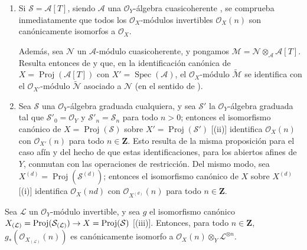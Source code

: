 \documentclass[oneside,10pt]{amsart}
\makeatletter
\newcommand{\ega@arrow}[2]{\mathchoice{#1}{#2}{#2}{#2}}
\renewcommand{\to}{\ega@arrow{\longrightarrow}{\rightarrow}}
\let\EGAOriginalLabel\label
\renewcommand{\label}[1]{\phantomsection\EGAOriginalLabel{#1}}
\makeatother
\begin{document}
\begin{remarks}[3.2.9]
\label{II.3.2.9-fr}
\medskip\noindent
\begin{enumerate}
  \item Si $\mathcal{S}=\mathcal{A}[T]$, siendo $\mathcal{A}$ una $\mathcal{O}_Y$-álgebra cuasicoherente , se comprueba inmediatamente que todos los $\mathcal{O}_X$-módulos invertibles $\mathcal{O}_X(n)$ son canónicamente isomorfos a $\mathcal{O}_X$.

    Además, sea $\mathcal{N}$ un $\mathcal{A}$-módulo cuasicoherente, y pongamos $\mathcal{M}=\mathcal{N}\otimes_{\mathcal{A}}\mathcal{A}[T]$.
    Resulta entonces de  y  que, en la identificación canónica de $X=\operatorname{Proj}(\mathcal{A}[T])$ con $X'=\operatorname{Spec}(\mathcal{A})$, el $\mathcal{O}_X$-módulo $\widetilde{\mathcal{M}}$ se identifica con el $\mathcal{O}_{X'}$-módulo $\widetilde{\mathcal{N}}$ asociado a $\mathcal{N}$ (en el sentido de ).
  \item Sea $\mathcal{S}$ una $\mathcal{O}_Y$-álgebra graduada cualquiera, y sea $\mathcal{S}'$ la $\mathcal{O}_Y$-álgebra graduada tal que $\mathcal{S}'_0=\mathcal{O}_Y$ y $\mathcal{S}'_n=\mathcal{S}_n$ para todo $n>0$; entonces el isomorfismo canónico de $X=\operatorname{Proj}(\mathcal{S})$ sobre $X'=\operatorname{Proj}(\mathcal{S}')$ [(ii)] identifica $\mathcal{O}_X(n)$ con $\mathcal{O}_{X'}(n)$ para todo $n\in\mathbf{Z}$.
    Esto resulta de la misma proposición para el caso afín  y del hecho de que estas identificaciones, para los abiertos afines de $Y$, conmutan con las operaciones de restricción.
    Del mismo modo, sea $X^{(d)}=\operatorname{Proj}(\mathcal{S}^{(d)})$; entonces el isomorfismo canónico de $X$ sobre $X^{(d)}$ [(i)] identifica $\mathcal{O}_X(nd)$ con $\mathcal{O}_{X^{(d)}}(n)$ para todo $n\in\mathbf{Z}$.
\end{enumerate}
\end{remarks}

\begin{proposition}[3.2.10]
\label{II.3.2.10-fr}
Sea $\mathcal{L}$ un $\mathcal{O}_Y$-módulo invertible, y sea $g$ el isomorfismo canónico $X_{(\mathcal{L})}=\operatorname{Proj}(\mathcal{S}_{(\mathcal{L})})
\to X=\operatorname{Proj}(\mathcal{S})$ [(iii)].
Entonces, para todo $n\in\mathbf{Z}$, $g_*(\mathcal{O}_{X_{(\mathcal{L})}}(n))$ es canónicamente isomorfo a $\mathcal{O}_X(n)\otimes_Y\mathcal{L}^{\otimes n}$.
\end{proposition}
\end{document}
